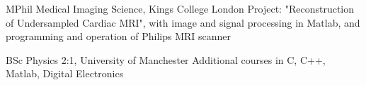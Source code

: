 %
%
%


\begin{scholarship}
    {MPhil Medical Imaging Science, Kings College London}
    {Project: "Reconstruction of Undersampled Cardiac MRI", with image and signal processing in Matlab, and programming and operation of Philips MRI scanner}
\end{scholarship}

\begin{scholarship}
    {BSc Physics 2:1, University of Manchester}
    {Additional courses in C, C++, Matlab, Digital Electronics}
\end{scholarship}




